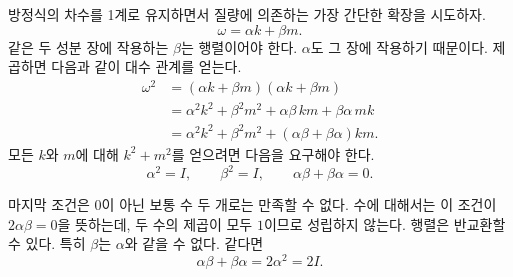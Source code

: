 방정식의 차수를 1계로 유지하면서 질량에 의존하는 가장 간단한 확장을 시도하자.
\begin{equation}
\omega=\alpha k+\beta m.
\end{equation}
같은 두 성분 장에 작용하는 \(\beta\)는 행렬이어야 한다. \(\alpha\)도 그 장에 작용하기 때문이다. 제곱하면 다음과 같이 대수 관계를 얻는다.
\begin{align}
\omega^2
&=(\alpha k+\beta m)(\alpha k+\beta m)\\
&=\alpha^2k^2+\beta^2m^2
+\alpha\beta\,km+\beta\alpha\,mk\\
&=\alpha^2k^2+\beta^2m^2
+(\alpha\beta+\beta\alpha)km.
\end{align}
모든 \(k\)와 \(m\)에 대해 \(k^2+m^2\)를 얻으려면 다음을 요구해야 한다.
\begin{equation}
\alpha^2=I,
\qquad
\beta^2=I,
\qquad
\alpha\beta+\beta\alpha=0.
\end{equation}

마지막 조건은 0이 아닌 보통 수 두 개로는 만족할 수 없다. 수에 대해서는 이 조건이 \(2\alpha\beta=0\)을 뜻하는데, 두 수의 제곱이 모두 \(1\)이므로 성립하지 않는다. 행렬은 반교환할 수 있다. 특히 \(\beta\)는 \(\alpha\)와 같을 수 없다. 같다면
\begin{equation}
\alpha\beta+\beta\alpha=2\alpha^2=2I.
\end{equation}

